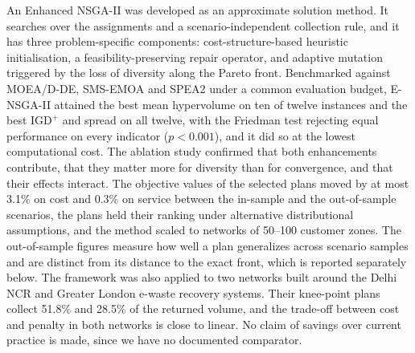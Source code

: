\documentclass[11pt, a4paper]{article}
\begin{document}
An Enhanced NSGA-II was developed as an approximate solution method. It searches over the assignments and a scenario-independent collection rule, and it has three
problem-specific components: cost-structure-based heuristic initialisation, a feasibility-preserving repair operator, and adaptive mutation triggered by the loss of diversity along the Pareto front. Benchmarked against MOEA/D-DE, SMS-EMOA and SPEA2 under a common evaluation budget, E-NSGA-II attained the best mean hypervolume on ten of twelve instances and the best $\text{IGD}^+$ and spread on all twelve, with the Friedman test
rejecting equal performance on every indicator ($p < 0.001$), and it did so at the lowest computational cost. The ablation study confirmed that both enhancements contribute, that they matter more for diversity than for convergence, and that their effects interact. The objective values of the selected plans moved by at most 3.1\% on cost and 0.3\% on service between the in-sample and the out-of-sample scenarios, the plans held their ranking under alternative distributional assumptions, and the method scaled to networks of 50--100 customer zones. The out-of-sample figures measure how well a plan generalizes across scenario samples and are distinct from its distance to the exact front, which is reported separately below. The framework was also applied to two networks built around the Delhi NCR and Greater London e-waste recovery systems. Their knee-point plans collect 51.8\% and 28.5\% of the returned volume, and the trade-off between cost and penalty in both networks is close to linear. No claim of savings over current practice is made, since we have no documented comparator.
\end{document}
